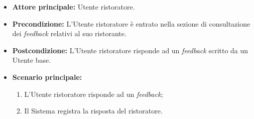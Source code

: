 \label{usecase:Risposta ad un feedback}
\begin{itemize}
	\item \textbf{Attore principale:} Utente ristoratore.

	\item \textbf{Precondizione:} L'Utente ristoratore è entrato nella sezione di consultazione dei \textit{feedback} relativi al suo ristorante.

	\item \textbf{Postcondizione:} L'Utente ristoratore risponde ad un \textit{feedback} scritto da un Utente base.


	\item \textbf{Scenario principale:}
	      \begin{enumerate}
		      \item L'Utente ristoratore risponde ad un \textit{feedback};
		      \item Il Sistema registra la risposta del ristoratore.

	      \end{enumerate}
\end{itemize}
